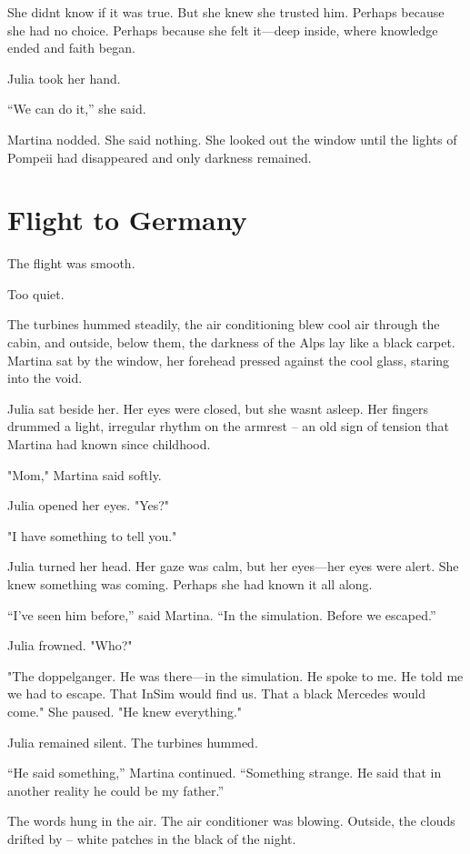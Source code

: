 \documentclass[
]{article}
\begin{document}
She didn\textquotesingle t know if it was true. But she knew she trusted him. Perhaps because she had no choice. Perhaps because she felt it---deep inside, where knowledge ended and faith began.

Julia took her hand.

``We can do it,'' she said.

Martina nodded. She said nothing. She looked out the window until the lights of Pompeii had disappeared and only darkness remained.

\section{Flight to Germany}\label{flight-to-germany}

The flight was smooth.

Too quiet.

The turbines hummed steadily, the air conditioning blew cool air through the cabin, and outside, below them, the darkness of the Alps lay like a black carpet. Martina sat by the window, her forehead pressed against the cool glass, staring into the void.

Julia sat beside her. Her eyes were closed, but she wasn\textquotesingle t asleep. Her fingers drummed a light, irregular rhythm on the armrest -- an old sign of tension that Martina had known since childhood.

"Mom," Martina said softly.

Julia opened her eyes. "Yes?"

"I have something to tell you."

Julia turned her head. Her gaze was calm, but her eyes---her eyes were alert. She knew something was coming. Perhaps she had known it all along.

``I've seen him before,'' said Martina. ``In the simulation. Before we escaped.''

Julia frowned. "Who?"

"The doppelganger. He was there---in the simulation. He spoke to me. He told me we had to escape. That InSim would find us. That a black Mercedes would come." She paused. "He knew everything."

Julia remained silent. The turbines hummed.

``He said something,'' Martina continued. ``Something strange. He said that in another reality he could be my father.''

The words hung in the air. The air conditioner was blowing. Outside, the clouds drifted by -- white patches in the black of the night.
\end{document}
